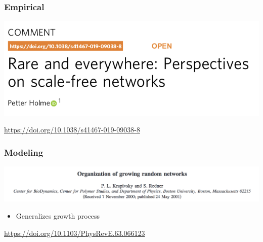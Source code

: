 \documentclass[aspectratio=169]{beamer}
\begin{document}
\begin{frame}
\frametitle{Empirical}

\begin{center}
\includegraphics[width=\textwidth]{figures/holme_rare_2019_title}
\end{center}

\vfill
\url{https://doi.org/10.1038/s41467-019-09038-8}



\end{frame}
\begin{frame}
\frametitle{Modeling}

\begin{center}
\includegraphics[width=\textwidth]{figures/krapivsky_organization_2001_title}
\end{center}

\begin{itemize}
\item Generalizes growth process
\end{itemize}

\vfill
\url{https://doi.org/10.1103/PhysRevE.63.066123}


\end{frame}
\end{document}
